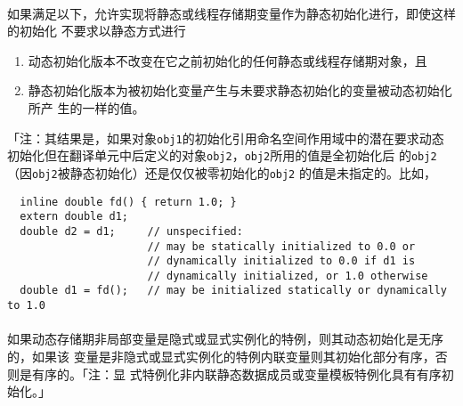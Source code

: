 \paragraph{}
如果满足以下，允许实现将静态或线程存储期变量作为静态初始化进行，即使这样的初始化
不要求以静态方式进行
\begin{enumerate}
  \item{动态初始化版本不改变在它之前初始化的任何静态或线程存储期对象，且}
  \item{静态初始化版本为被初始化变量产生与未要求静态初始化的变量被动态初始化所产
    生的一样的值。}
\end{enumerate}
「注：其结果是，如果对象\texttt{obj1}的初始化引用命名空间作用域中的潜在要求动态
初始化但在翻译单元中后定义的对象\texttt{obj2}，\texttt{obj2}所用的值是全初始化后
的\texttt{obj2}（因\texttt{obj2}被静态初始化）还是仅仅被零初始化的\texttt{obj2}
的值是未指定的。比如，
\begin{lstlisting}
  inline double fd() { return 1.0; }
  extern double d1;
  double d2 = d1;     // unspecified:
                      // may be statically initialized to 0.0 or
                      // dynamically initialized to 0.0 if d1 is
                      // dynamically initialized, or 1.0 otherwise
  double d1 = fd();   // may be initialized statically or dynamically to 1.0
\end{lstlisting}

\paragraph{}
如果动态存储期非局部变量是隐式或显式实例化的特例，则其动态初始化是无序的，如果该
变量是非隐式或显式实例化的特例内联变量则其初始化部分有序，否则是有序的。「注：显
式特例化非内联静态数据成员或变量模板特例化具有有序初始化。」

